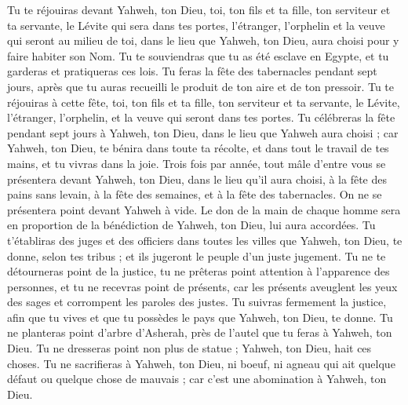 \begin{multicols}{2}
Tu te réjouiras devant Yahweh, ton Dieu, toi, ton fils et ta fille, ton serviteur et ta servante, le Lévite qui sera dans tes portes, l'étranger, l'orphelin et la veuve qui seront au milieu de toi, dans le lieu que Yahweh, ton Dieu, aura choisi pour y faire habiter son Nom.
Tu te souviendras que tu as été esclave en Egypte, et tu garderas et pratiqueras ces lois.
Tu feras la fête des tabernacles pendant sept jours, après que tu auras recueilli le produit de ton aire et de ton pressoir.
Tu te réjouiras à cette fête, toi, ton fils et ta fille, ton serviteur et ta servante, le Lévite, l'étranger, l'orphelin, et la veuve qui seront dans tes portes.
Tu célébreras la fête pendant sept jours à Yahweh, ton Dieu, dans le lieu que Yahweh aura choisi ; car Yahweh, ton Dieu, te bénira dans toute ta récolte, et dans tout le travail de tes mains, et tu vivras dans la joie.
Trois fois par année, tout mâle d'entre vous se présentera devant Yahweh, ton Dieu, dans le lieu qu'il aura choisi, à la fête des pains sans levain, à la fête des semaines, et à la fête des tabernacles. On ne se présentera point devant Yahweh à vide.
Le don de la main de chaque homme sera en proportion de la bénédiction de Yahweh, ton Dieu, lui aura accordées.
Tu t'établiras des juges et des officiers dans toutes les villes que Yahweh, ton Dieu, te donne, selon tes tribus ; et ils jugeront le peuple d’un juste jugement.
Tu ne te détourneras point de la justice, tu ne prêteras point attention à l'apparence des personnes, et tu ne recevras point de présents, car les présents aveuglent les yeux des sages et corrompent les paroles des justes.
Tu suivras fermement la justice, afin que tu vives et que tu possèdes le pays que Yahweh, ton Dieu, te donne.
Tu ne planteras point d’arbre d’Asherah, près de l'autel que tu feras à Yahweh, ton Dieu.
Tu ne dresseras point non plus de statue ; Yahweh, ton Dieu, hait ces choses.
\VerseOne{}Tu ne sacrifieras à Yahweh, ton Dieu, ni boeuf, ni agneau qui ait quelque défaut ou quelque chose de mauvais ; car c'est une abomination à Yahweh, ton Dieu.

\end{multicols}
